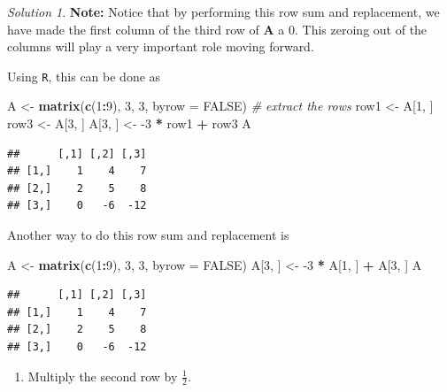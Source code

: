 \documentclass[
]{book}
\newenvironment{Shaded}{\begin{snugshade}}{\end{snugshade}}
\newcommand{\CommentTok}[1]{\textcolor[rgb]{0.56,0.35,0.01}{\textit{#1}}}
\newcommand{\DataTypeTok}[1]{\textcolor[rgb]{0.13,0.29,0.53}{#1}}
\newcommand{\DecValTok}[1]{\textcolor[rgb]{0.00,0.00,0.81}{#1}}
\newcommand{\KeywordTok}[1]{\textcolor[rgb]{0.13,0.29,0.53}{\textbf{#1}}}
\newcommand{\NormalTok}[1]{#1}
\newcommand{\OperatorTok}[1]{\textcolor[rgb]{0.81,0.36,0.00}{\textbf{#1}}}
\newcommand{\OtherTok}[1]{\textcolor[rgb]{0.56,0.35,0.01}{#1}}
\newcommand{\StringTok}[1]{\textcolor[rgb]{0.31,0.60,0.02}{#1}}
\providecommand{\tightlist}{%
  \setlength{\itemsep}{0pt}\setlength{\parskip}{0pt}}
\theoremstyle{definition}
\theoremstyle{definition}
\theoremstyle{definition}
\theoremstyle{remark}
\newtheorem*{solution}{Solution}
\begin{document}
\begin{solution}
\textbf{Note:} Notice that by performing this row sum and replacement, we have made the first column of the third row of \(\mathbf{A}\) a 0. This zeroing out of the columns will play a very important role moving forward.

Using \texttt{R}, this can be done as

\begin{Shaded}
\begin{Highlighting}[]
\NormalTok{A <-}\StringTok{ }\KeywordTok{matrix}\NormalTok{(}\KeywordTok{c}\NormalTok{(}\DecValTok{1}\OperatorTok{:}\DecValTok{9}\NormalTok{), }\DecValTok{3}\NormalTok{, }\DecValTok{3}\NormalTok{, }\DataTypeTok{byrow =} \OtherTok{FALSE}\NormalTok{)}
\CommentTok{# extract the rows }
\NormalTok{row1 <-}\StringTok{ }\NormalTok{A[}\DecValTok{1}\NormalTok{, ]}
\NormalTok{row3 <-}\StringTok{ }\NormalTok{A[}\DecValTok{3}\NormalTok{, ]}
\NormalTok{A[}\DecValTok{3}\NormalTok{, ] <-}\StringTok{ }\DecValTok{-3} \OperatorTok{*}\StringTok{ }\NormalTok{row1 }\OperatorTok{+}\StringTok{ }\NormalTok{row3}
\NormalTok{A}
\end{Highlighting}
\end{Shaded}

\begin{verbatim}
##      [,1] [,2] [,3]
## [1,]    1    4    7
## [2,]    2    5    8
## [3,]    0   -6  -12
\end{verbatim}

Another way to do this row sum and replacement is

\begin{Shaded}
\begin{Highlighting}[]
\NormalTok{A <-}\StringTok{ }\KeywordTok{matrix}\NormalTok{(}\KeywordTok{c}\NormalTok{(}\DecValTok{1}\OperatorTok{:}\DecValTok{9}\NormalTok{), }\DecValTok{3}\NormalTok{, }\DecValTok{3}\NormalTok{, }\DataTypeTok{byrow =} \OtherTok{FALSE}\NormalTok{)}
\NormalTok{A[}\DecValTok{3}\NormalTok{, ] <-}\StringTok{ }\DecValTok{-3} \OperatorTok{*}\StringTok{ }\NormalTok{A[}\DecValTok{1}\NormalTok{, ] }\OperatorTok{+}\StringTok{ }\NormalTok{A[}\DecValTok{3}\NormalTok{, ]}
\NormalTok{A}
\end{Highlighting}
\end{Shaded}

\begin{verbatim}
##      [,1] [,2] [,3]
## [1,]    1    4    7
## [2,]    2    5    8
## [3,]    0   -6  -12
\end{verbatim}

\begin{enumerate}
\def\labelenumi{\arabic{enumi})}
\setcounter{enumi}{2}
\tightlist
\item
  Multiply the second row by \(\frac{1}{2}\).
\end{enumerate}


\end{solution}
\end{document}

